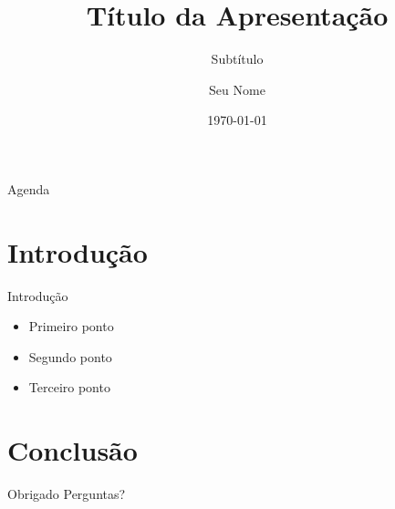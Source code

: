 \documentclass[aspectratio=169]{beamer}
\title{Título da Apresentação}
\subtitle{Subtítulo}
\author{Seu Nome}
\date{\today}
\begin{document}
\begin{frame}
  \titlepage
\end{frame}

\begin{frame}{Agenda}
  \tableofcontents
\end{frame}

\section{Introdução}

\begin{frame}{Introdução}
  \begin{itemize}
    \item Primeiro ponto
    \item Segundo ponto
    \item Terceiro ponto
  \end{itemize}
\end{frame}

\section{Conclusão}

\begin{frame}{Obrigado}
  \centering
  \Large
  Perguntas?
\end{frame}
\end{document}
